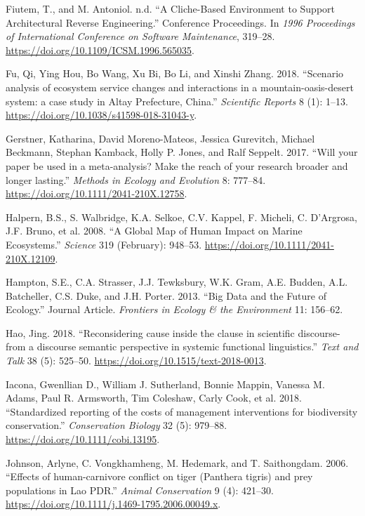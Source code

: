 \documentclass[fleqn,10pt]{wlpeerj} %
\begin{document}
\leavevmode\hypertarget{ref-Fiutem1996}{}%
Fiutem, T., and M. Antoniol. n.d. ``A Cliche-Based Environment to
Support Architectural Reverse Engineering.'' Conference Proceedings. In
\emph{1996 Proceedings of International Conference on Software
Maintenance}, 319--28. \url{https://doi.org/10.1109/ICSM.1996.565035}.

\leavevmode\hypertarget{ref-Fu2018}{}%
Fu, Qi, Ying Hou, Bo Wang, Xu Bi, Bo Li, and Xinshi Zhang. 2018.
``Scenario analysis of ecosystem service changes and interactions in a
mountain-oasis-desert system: a case study in Altay Prefecture, China.''
\emph{Scientific Reports} 8 (1): 1--13.
\url{https://doi.org/10.1038/s41598-018-31043-y}.

\leavevmode\hypertarget{ref-Gerstner2017}{}%
Gerstner, Katharina, David Moreno-Mateos, Jessica Gurevitch, Michael
Beckmann, Stephan Kamback, Holly P. Jones, and Ralf Seppelt. 2017.
``Will your paper be used in a meta-analysis? Make the reach of your
research broader and longer lasting.'' \emph{Methods in Ecology and
Evolution} 8: 777--84. \url{https://doi.org/10.1111/2041-210X.12758}.

\leavevmode\hypertarget{ref-Halpern2008}{}%
Halpern, B.S., S. Walbridge, K.A. Selkoe, C.V. Kappel, F. Micheli, C.
D'Argrosa, J.F. Bruno, et al. 2008. ``A Global Map of Human Impact on
Marine Ecosystems.'' \emph{Science} 319 (February): 948--53.
\url{https://doi.org/10.1111/2041-210X.12109}.

\leavevmode\hypertarget{ref-Hampton2013}{}%
Hampton, S.E., C.A. Strasser, J.J. Tewksbury, W.K. Gram, A.E. Budden,
A.L. Batcheller, C.S. Duke, and J.H. Porter. 2013. ``Big Data and the
Future of Ecology.'' Journal Article. \emph{Frontiers in Ecology \& the
Environment} 11: 156--62.

\leavevmode\hypertarget{ref-Hao2018}{}%
Hao, Jing. 2018. ``Reconsidering cause inside the clause in scientific
discourse-from a discourse semantic perspective in systemic functional
linguistics.'' \emph{Text and Talk} 38 (5): 525--50.
\url{https://doi.org/10.1515/text-2018-0013}.

\leavevmode\hypertarget{ref-Iacona2018}{}%
Iacona, Gwenllian D., William J. Sutherland, Bonnie Mappin, Vanessa M.
Adams, Paul R. Armsworth, Tim Coleshaw, Carly Cook, et al. 2018.
``Standardized reporting of the costs of management interventions for
biodiversity conservation.'' \emph{Conservation Biology} 32 (5):
979--88. \url{https://doi.org/10.1111/cobi.13195}.

\leavevmode\hypertarget{ref-Johnson2006}{}%
Johnson, Arlyne, C. Vongkhamheng, M. Hedemark, and T. Saithongdam. 2006.
``Effects of human-carnivore conflict on tiger (Panthera tigris) and
prey populations in Lao PDR.'' \emph{Animal Conservation} 9 (4):
421--30. \url{https://doi.org/10.1111/j.1469-1795.2006.00049.x}.
\end{document}
